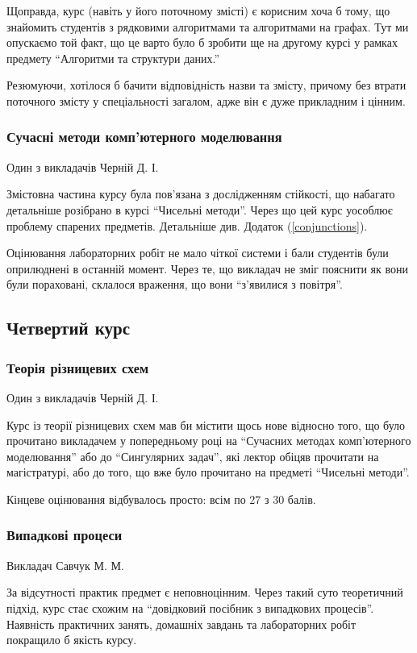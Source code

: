 \documentclass[14pt, a4paper]{extarticle}  %
\begin{document}
Щоправда, курс (навіть у його поточному змісті) є корисним хоча б тому, що знайомить студентів з рядковими алгоритмами та алгоритмами на графах. Тут ми опускаємо той факт, що це варто було б зробити ще на другому курсі у рамках предмету ``Алгоритми та структури даних.'' 

Резюмуючи, хотілося б бачити відповідність назви та змісту, причому без втрати поточного змісту у спеціальності загалом, адже він є дуже прикладним і цінним.

\subsubsection{Сучасні методи комп'ютерного моделювання}
Один з викладачів Черній Д. І.

Змістовна частина курсу була пов'язана з дослідженням стійкості, що набагато детальніше розібрано в курсі ``Чисельні методи''. Через що цей курс уособлює проблему спарених предметів. Детальніше див. Додаток (\ref{conjunctions}).

Оцінювання лабораторних робіт не мало чіткої системи і бали студентів були оприлюднені в останній момент. Через те, що  викладач не зміг пояснити як вони були пораховані, склалося враження, що вони ``з'явилися з повітря''. 

\subsection{Четвертий курс}
\subsubsection{Теорія різницевих схем} 
Один з викладачів Черній Д. І.

Курс із теорії різницевих схем мав би містити щось нове відносно того, що було прочитано викладачем у попередньому році на ``Сучасних методах комп'ютерного моделювання'' або до ``Сингулярних задач'', які лектор обіцяв прочитати на магістратурі, або до того, що вже було прочитано на предметі ``Чисельні методи''. 

Кінцеве оцінювання відбувалось просто: всім по 27 з 30 балів. 

\subsubsection{Випадкові процеси} 
Викладач Савчук М. М. 

За відсутності практик предмет є неповноцінним. Через такий суто теоретичний підхід, курс стає схожим на ``довідковий посібник з випадкових процесів''. Наявність практичних занять, домашніх завдань та лабораторних робіт покращило б якість курсу. 
\end{document}
